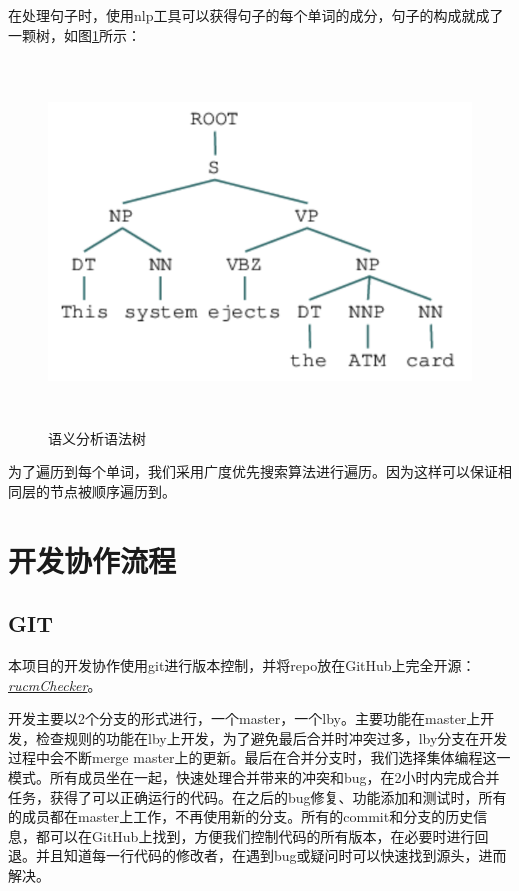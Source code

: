         在处理句子时，使用nlp工具可以获得句子的每个单词的成分，句子的构成就成了一颗树，如图\ref{fig-coding-semantic-tree}所示：

        \begin{figure}
        \centering
        \includegraphics[width=5.76806in,height=3.80013in]{src/coding-semantic-tree.png}
        \caption{语义分析语法树}
        \label{fig-coding-semantic-tree}
        \end{figure}

        为了遍历到每个单词，我们采用广度优先搜索算法进行遍历。因为这样可以保证相同层的节点被顺序遍历到。

\section{开发协作流程}
    \subsection{GIT}
    本项目的开发协作使用git进行版本控制，并将repo放在GitHub上完全开源：\href{https://github.com/zen1995/rucmChecker}{\emph{rucmChecker}}。

    开发主要以2个分支的形式进行，一个master，一个lby。主要功能在master上开发，检查规则的功能在lby上开发，为了避免最后合并时冲突过多，lby分支在开发过程中会不断merge master上的更新。最后在合并分支时，我们选择集体编程这一模式。所有成员坐在一起，快速处理合并带来的冲突和bug，在2小时内完成合并任务，获得了可以正确运行的代码。在之后的bug修复、功能添加和测试时，所有的成员都在master上工作，不再使用新的分支。所有的commit和分支的历史信息，都可以在GitHub上找到，方便我们控制代码的所有版本，在必要时进行回退。并且知道每一行代码的修改者，在遇到bug或疑问时可以快速找到源头，进而解决。
